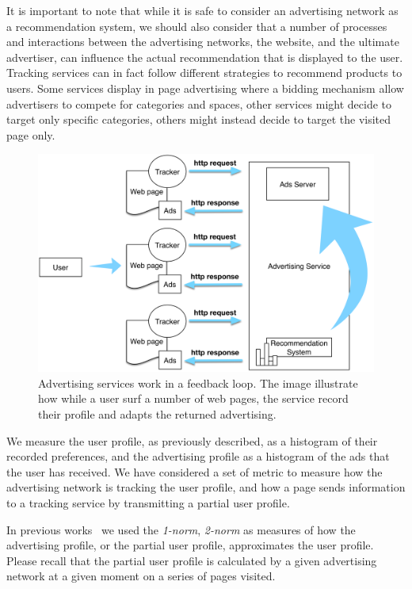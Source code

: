 It is important to note that while it is safe to consider an advertising network as a recommendation system, we should also consider that a number of processes and interactions between the advertising networks, the website, and the ultimate advertiser, can influence the actual recommendation that is displayed to the user. Tracking services can in fact follow different strategies to recommend products to users. Some services display in page advertising where a bidding mechanism allow advertisers to compete for categories and spaces, other services might decide to target only specific categories, others might instead decide to target the visited page only.

\begin{figure}
\includegraphics[width=\textwidth]{figures/advertising-loop.png}
\caption[Advertising services feedback loop]{Advertising services work in a feedback loop. The image illustrate how while a user surf a number of web pages, the service record their profile and adapts the returned advertising.}
\label{fig:advertising-loop}
\end{figure}

We measure the user profile, as previously described, as a histogram of their recorded preferences, and the advertising profile as a histogram of the ads that the user has received. We have considered a set of metric to measure how the advertising network is tracking the user profile, and how a page sends information to a tracking service by transmitting a partial user profile.

In previous works\cite{puglisi2016web}~\cite{puglisi2015you} we used the \emph{1-norm}, \emph{2-norm} as measures of how the advertising profile, or the partial user profile, approximates the user profile. Please recall that the partial user profile is calculated by a given advertising network at a given moment on a series of pages visited.

